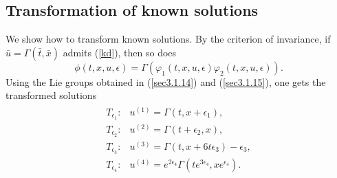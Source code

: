 \subsection{Transformation of known solutions}
We show how to transform known solutions.
By the criterion of invariance, if $ \bar{u} = \Gamma( \bar{t}, \bar{x})$ admits (\ref{kd}), then so does \begin{equation}
\phi(t,x,u,\epsilon) = \Gamma ( \varphi_1(t,x,u,\epsilon) \varphi_2(t,x,u,\epsilon) ). \label{sec3.1.16}
\end{equation}
Using the Lie groups obtained in (\ref{sec3.1.14}) and (\ref{sec3.1.15}), one gets  the transformed solutions 
\begin{align} \begin{aligned} 
T_{\epsilon_1}:& u^{(1)} = \Gamma(t,x + \epsilon_1),\\
T_{\epsilon_2}:& u^{(2)} = \Gamma(t + \epsilon_2,x),\\
T_{\epsilon_3}: &u^{(3)} = \Gamma(t,x + 6 t\epsilon_3) - \epsilon_3,\\
T_{\epsilon_4}: &u^{(4)} =e^{2 \epsilon_4} \Gamma(te^{3 \epsilon_4},x e^{\epsilon_4}).\\
\label{sec3.1.17} \end{aligned}
\end{align}
